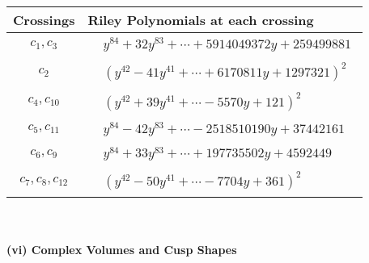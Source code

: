 \documentclass[1p]{elsarticle_modified}
\theoremstyle{definition}
\begin{document}
\begin{tabular}{m{50pt}|m{274pt}}
Crossings & \hspace{64pt}Riley Polynomials at each crossing \\
\hline $$\begin{aligned}c_{1},c_{3}\end{aligned}$$&$\begin{aligned}
&y^{84}+32 y^{83}+\cdots+5914049372 y+259499881
\end{aligned}$\\
\hline $$\begin{aligned}c_{2}\end{aligned}$$&$\begin{aligned}
&(y^{42}-41 y^{41}+\cdots+6170811 y+1297321)^{2}
\end{aligned}$\\
\hline $$\begin{aligned}c_{4},c_{10}\end{aligned}$$&$\begin{aligned}
&(y^{42}+39 y^{41}+\cdots-5570 y+121)^{2}
\end{aligned}$\\
\hline $$\begin{aligned}c_{5},c_{11}\end{aligned}$$&$\begin{aligned}
&y^{84}-42 y^{83}+\cdots-2518510190 y+37442161
\end{aligned}$\\
\hline $$\begin{aligned}c_{6},c_{9}\end{aligned}$$&$\begin{aligned}
&y^{84}+33 y^{83}+\cdots+197735502 y+4592449
\end{aligned}$\\
\hline $$\begin{aligned}c_{7},c_{8},c_{12}\end{aligned}$$&$\begin{aligned}
&(y^{42}-50 y^{41}+\cdots-7704 y+361)^{2}
\end{aligned}$\\
\hline
\end{tabular}\\~\\
\newpage\flushleft \textbf{(vi) Complex Volumes and Cusp Shapes}
\end{document}
